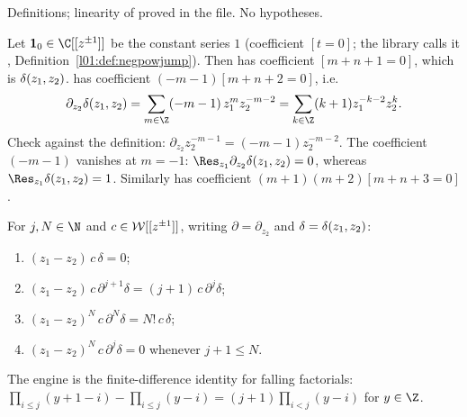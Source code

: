\begin{status}
Definitions; linearity of  proved in the file. No hypotheses.
\end{status}

\begin{example}\label{l01:ex:deltaderiv}
Let $\mathbf 1_0\in\C[[z^{\pm1}]]$ be the constant series $1$ (coefficient $[t = 0]$; the library calls it
, Definition~\ref{l01:def:negpowjump}). Then  has coefficient
$[m+n+1 = 0]$, which is $\delta(z_1,z_2)$.  has coefficient $(-m-1)[m+n+2 = 0]$, i.e.
\begin{equation*}
  \partial_{z_2}\lonedelta = \sum_{m\in\Z}(-m-1)\,z_1^{m}z_2^{-m-2} = \sum_{k\in\Z}(k+1)z_1^{-k-2}z_2^{k}.
\end{equation*}
Check against the definition: $\partial_{z_2}z_2^{-m-1} = (-m-1)z_2^{-m-2}$. The coefficient
$(-m-1)$ vanishes at $m = -1$: $\Res_{z_1}\partial_{z_2}\lonedelta = 0$, whereas $\Res_{z_1}\lonedelta = 1$.
Similarly  has coefficient $(m+1)(m+2)[m+n+3 = 0]$.
\end{example}

\begin{proposition}\label{l01:prop:peel}
For $j,N\in\N$ and $c\in\mathcal{W}[[z^{\pm1}]]$, writing $\partial = \partial_{z_2}$ and $\delta = \delta(z_1,z_2)$:
\begin{enumerate}[label=(\alph*)]
\item $(z_1-z_2)\,c\,\delta = 0$;
\item $(z_1-z_2)\,c\,\partial^{j+1}\delta = (j+1)\,c\,\partial^j\delta$;
\item $(z_1-z_2)^N\,c\,\partial^N\delta = N!\,c\,\delta$;
\item $(z_1-z_2)^N\,c\,\partial^j\delta = 0$ whenever $j+1\le N$.
\end{enumerate}
The engine is the finite-difference identity for falling factorials:
$\prod_{i\le j}(y+1-i)-\prod_{i\le j}(y-i) = (j+1)\prod_{i<j}(y-i)$ for $y\in\Z$.
\end{proposition}

